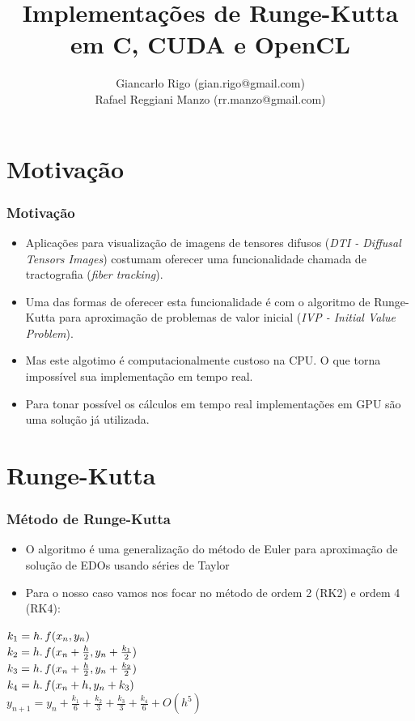 \documentclass[brazil]{beamer}
\title{Implementações de Runge-Kutta em C, CUDA e OpenCL}
\author{Giancarlo Rigo (gian.rigo@gmail.com) \\
        Rafael Reggiani Manzo (rr.manzo@gmail.com)}
\begin{document}
\maketitle

\section{Motivação}
\begin{frame}
  \frametitle{Motivação}
  
  \begin{itemize}
    \item Aplicações para visualização de imagens de tensores difusos (\textit{DTI - Diffusal Tensors Images}) costumam oferecer uma funcionalidade chamada de tractografia (\textit{fiber tracking}).
    \item Uma das formas de oferecer esta funcionalidade é com o algoritmo de Runge-Kutta para aproximação de problemas de valor inicial (\textit{IVP - Initial Value Problem}).
    \item Mas este algotimo é computacionalmente custoso na CPU. O que torna impossível sua implementação em tempo real.
    \item Para tonar possível os cálculos em tempo real implementações em GPU são uma solução já utilizada. 
  \end{itemize}
  
\end{frame}

\section{Runge-Kutta}
\begin{frame}
  \frametitle{Método de Runge-Kutta}
  
  \begin{itemize}
    \item O algoritmo é uma generalização do método de Euler para aproximação de solução de EDOs usando séries de Taylor
    \item Para o nosso caso vamos nos focar no método de ordem 2 (RK2) e  ordem 4 (RK4):
  \end{itemize}
 
  $ k_{1} = h\ldotp f(x_{n},y_{n}) $\\
  $ k_{2} = h\ldotp f(x_{n} + \frac{h}{2},y_{n} + \frac{k_{1}}{2}) $\\
  $ k_{3} = h\ldotp f(x_{n} + \frac{h}{2},y_{n} + \frac{k_{2}}{2}) $\\
  $ k_{4} = h\ldotp f(x_{n} + h,y_{n} + k_{3}) $\\
  $ y_{n+1} = y_{n} + \frac{k_{1}}{6} + \frac{k_{2}}{3} + \frac{k_{3}}{3} + \frac{k_{4}}{6} + O(h^{5}) $ 
  
\end{frame}
\end{document}
